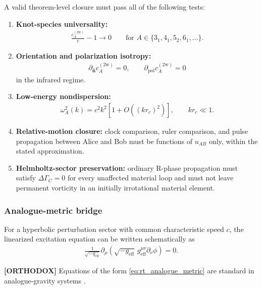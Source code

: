 A valid theorem-level closure must pass all of the following tests:
\begin{enumerate}
    \item \textbf{Knot-species universality:}
    \begin{align}
        \frac{c_A^{(2\mathrm w)}}{c}-1
        \longrightarrow 0
        \qquad
        \text{for }A\in\{3_1,4_1,5_2,6_1,\ldots\}.
    \end{align}
    \item \textbf{Orientation and polarization isotropy:}
    \begin{align}
        \partial_{\hat{\mathbf n}}c_A^{(2\mathrm w)}=0,
        \qquad
        \partial_{\mathrm{pol}}c_A^{(2\mathrm w)}=0
    \end{align}
    in the infrared regime.
    \item \textbf{Low-energy nondispersion:}
    \begin{align}
        \omega_A^2(k)
        =
        c^2k^2
        \left[1+O\!\left((kr_c)^2\right)\right],
        \qquad
        kr_c\ll1 .
        \label{eq:rt_torsion_ir_dispersion_target}
    \end{align}
    \item \textbf{Relative-motion closure:} clock comparison, ruler comparison,
    and pulse propagation between Alice and Bob must be functions of \(u_{AB}\)
    only, within the stated approximation.
    \item \textbf{Helmholtz-sector preservation:} ordinary R-phase propagation
    must satisfy \(\Delta\Gamma_C=0\) for every unaffected material loop and
    must not leave permanent vorticity in an initially irrotational material
    element.
\end{enumerate}

\subsubsection{Analogue-metric bridge}

For a hyperbolic perturbation sector with common characteristic speed \(c\),
the linearized excitation equation can be written schematically as
\begin{align}
    \frac{1}{\sqrt{-g_{\mathrm{eff}}}}
    \partial_\mu
    \left(
        \sqrt{-g_{\mathrm{eff}}}\,
        g_{\mathrm{eff}}^{\mu\nu}
        \partial_\nu \phi
    \right)
    =
    0 .
    \label{eq:rt_analogue_metric}
\end{align}

\textbf{[ORTHODOX]} Equations of the form
\eqref{eq:rt_analogue_metric} are standard in analogue-gravity systems
\cite{Unruh1981,BarceloLiberatiVisser2011,BarceloLiberatiVisser2026}.

